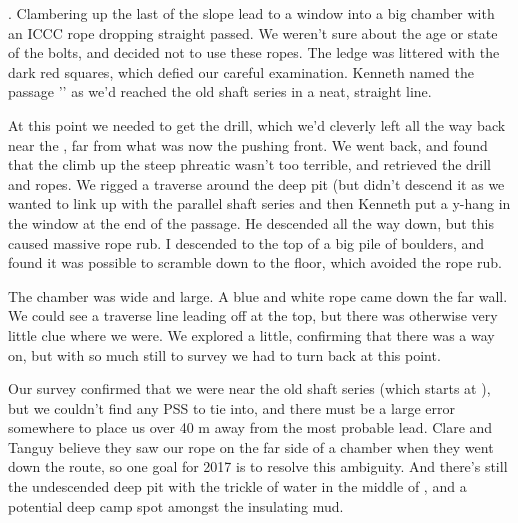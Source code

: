 . Clambering up the last of the slope lead to a window into a big chamber with an ICCC rope dropping straight passed. We weren’t sure about the age or state of the bolts, and decided not to use these ropes. The ledge was littered with the dark red squares, which defied our careful examination. Kenneth named the passage '' as we’d reached the old shaft series in a neat, straight line.
 
At this point we needed to get the drill, which we’d cleverly left all the way back near the , far from what was now the pushing front. We went back, and found that the climb up the steep phreatic wasn’t too terrible, and retrieved the drill and ropes. We rigged a traverse around the deep pit (but didn’t descend it as we wanted to link up with the parallel shaft series  and then Kenneth put a y-hang in the window at the end of the passage. He descended all the way down, but this caused massive rope rub. I descended to the top of a big pile of boulders, and found it was possible to scramble down to the floor, which avoided the rope rub.
 
The chamber was wide and large. A blue and white rope came down the far wall. We could see a traverse line leading off at the top, but there was otherwise very little clue where we were. We explored a little, confirming that there was a way on, but with so much still to survey we had to turn back at this point.
 
Our survey confirmed that we were near the old shaft series (which starts at ), but we couldn’t find any PSS to tie into, and there must be a large error somewhere to place us over 40 m away from the most probable lead. Clare and Tanguy believe they saw our rope on the far side of a chamber when they went down the  route, so one goal for 2017 is to resolve this ambiguity. And there’s still the undescended deep pit with the trickle of water in the middle of , and a potential deep camp spot amongst the insulating mud.
 
